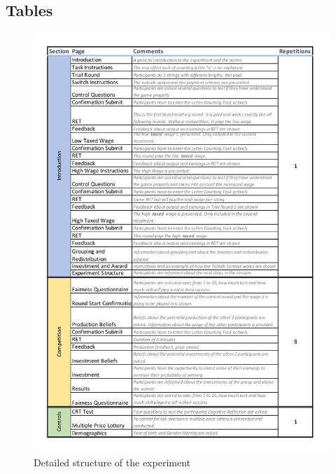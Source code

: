 \thispagestyle{fancy}

\begin{appendices}

\chapter{Tables}

    \begin{figure}
        \centering
        \includegraphics[width=\textwidth]{graphs/Experimental_Design.pdf}
        \caption{Detailed structure of the experiment}
        \label{tab:exp_design}
    \end{figure}

\end{appendices}